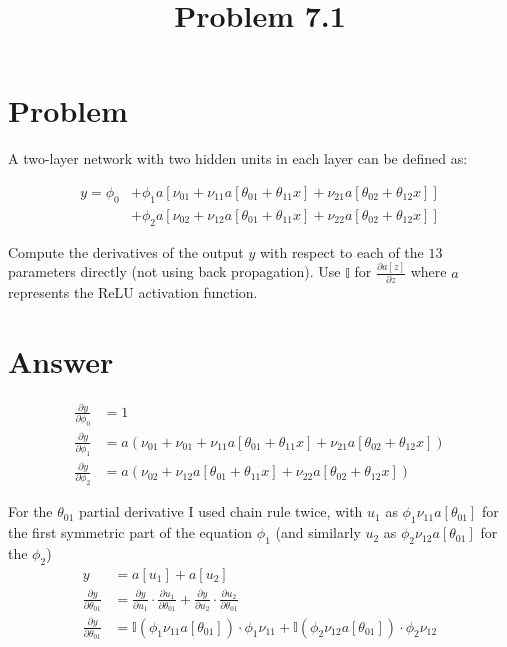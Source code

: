 \documentclass{article}
\title{Problem 7.1}
\begin{document}
\maketitle

\section{Problem}

A two-layer network with two hidden units in each layer can be defined as:

\begin{align*}
    y = \phi_{0}
    &+ \phi_{1}a
     \left[
        \nu_{01}
        + \nu_{11}a[\theta_{01} + \theta_{11}x]
        + \nu_{21}a[\theta_{02} + \theta_{12}x]
      \right]
      \\
    &+ \phi_{2}a
    \left[
        \nu_{02}
        + \nu_{12}a[\theta_{01} + \theta_{11}x]
        + \nu_{22}a[\theta_{02} + \theta_{12}x]
    \right]
\end{align*}

Compute the derivatives of the output $y$ with respect to each of the $13$ parameters directly (not using back propagation).  Use $\mathbb{I}$ for $ \frac{\partial{a[z]}}{\partial{z}}$ where $a$ represents the ReLU activation function.

\section{Answer}

\begin{align*}
    \frac{\partial{y}}{\partial{\phi_{0}}} &=
    1
    \\
    \frac{\partial{y}}{\partial{\phi_{1}}} &=
    a
    (
        \nu_{01} +\nu_{01}
        + \nu_{11}a[\theta_{01} + \theta_{11}x]
        + \nu_{21}a[\theta_{02} + \theta_{12}x]
    ) 
    \\
    \frac{\partial{y}}{\partial{\phi_{2}}} &=
    a
    (
        \nu_{02}
        + \nu_{12}a[\theta_{01} + \theta_{11}x]
        + \nu_{22}a[\theta_{02} + \theta_{12}x]
    ) 
\end{align*}

For the $\theta_{01}$ partial derivative I used chain rule twice, with $u_{1}$ as $\phi_{1}\nu_{11}a[\theta_{01}]$ for the first symmetric part of the equation $\phi_{1}$ (and similarly $u_{2}$ as  $\phi_{2}\nu_{12}a[\theta_{01}]$ for the $\phi_{2}$)
\begin{align*}
    y &= a[u_{1}] + a[u_{2}]
    \\
    \frac{\partial{y}}{\partial{\theta_{01}}} &=
    \frac{\partial{y}}{\partial{u_{1}}} \cdot \frac{\partial{u_{1}}}{\partial{\theta_{01}}} +  
    \frac{\partial{y}}{\partial{u_{2}}} \cdot \frac{\partial{u_{2}}}{\partial{\theta_{01}}}
    \\
    \frac{\partial{y}}{\partial{\theta_{01}}} &=
    \mathbb{I}(\phi_{1}\nu_{11}a[\theta_{01}]) \cdot \phi_{1}\nu_{11} + \mathbb{I}(\phi_{2}\nu_{12}a[\theta_{01}]) \cdot \phi_{2}\nu_{12}
\end{align*}
\end{document}
